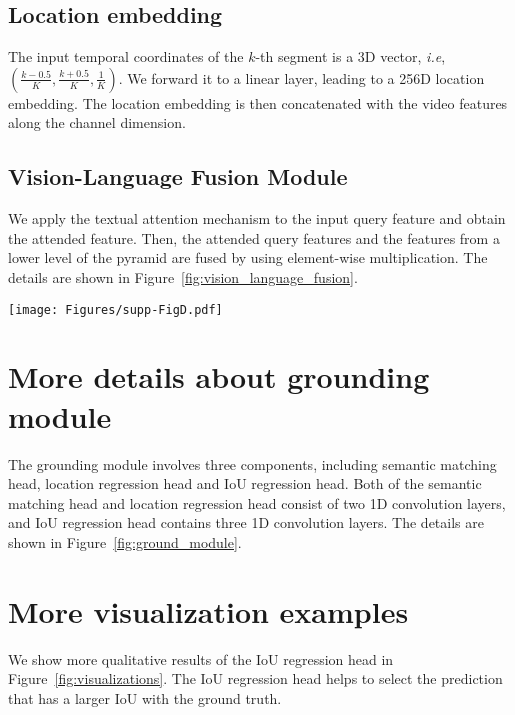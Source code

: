 \documentclass[10pt,twocolumn,letterpaper]{article}
\def\ie{\emph{i.e}\onedot} \def\Ie{\emph{I.e}\onedot}
\begin{document}
\subsection{Location embedding}

The input temporal coordinates of the $k$-th segment is a 3D vector, \ie, $(\frac{k-0.5}{K}, \frac{k+0.5}{K}, \frac{1}{K})$. We forward it to a linear layer, leading to a 256D location embedding. The location embedding is then concatenated with the video features along the channel dimension.




\subsection{Vision-Language Fusion Module}

We apply the textual attention mechanism to the input query feature and obtain the attended feature. Then, the attended query features and the features from a lower level of the pyramid are fused by using element-wise multiplication. The details are shown in Figure~\ref{fig:vision_language_fusion}.




\begin{figure*}[!t]
	\centering
	\texttt{[image: Figures/supp-FigD.pdf]}
	\centering
\caption{Qualitative results.}
	\label{fig:visualizations}
\end{figure*}

\section{More details about grounding module}
\label{sec:grounding}

The grounding module involves three components, including semantic matching head, location regression head and IoU regression head.
Both of the semantic matching head and location regression head consist of two 1D convolution layers, and IoU regression head contains three 1D convolution layers. 
The details are shown in Figure~\ref{fig:ground_module}.

\section{More visualization examples}
\label{sec:visual}

We show more qualitative results of the IoU regression head in Figure~\ref{fig:visualizations}. The IoU regression head helps to select the prediction that has a larger IoU with the ground truth.
\end{document}
